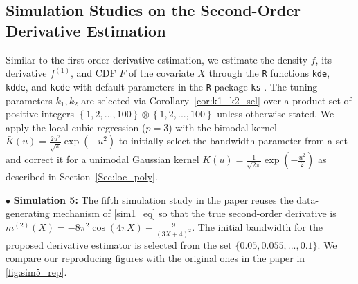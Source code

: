 \documentclass{uwstat572}
\theoremstyle{definition}
\theoremstyle{theorem}
\begin{document}
\subsection{Simulation Studies on the Second-Order Derivative Estimation}

Similar to the first-order derivative estimation, we estimate the density $f$, its derivative $f^{(1)}$, and CDF $F$ of the covariate $X$ through the \texttt{R} functions \texttt{kde}, \texttt{kdde}, and \texttt{kcde} with default parameters in the \texttt{R} package \texttt{ks} \citep{ks2022R}. The tuning parameters $k_1,k_2$ are selected via Corollary~\ref{cor:k1_k2_sel} over a product set of positive integers $\left\{1,2,...,100\right\}\otimes \left\{1,2,...,100\right\}$ unless otherwise stated. We apply the local cubic regression ($p=3$) with the bimodal kernel $\bar{K}(u)=\frac{2u^2}{\sqrt{\pi}} \exp\left(-u^2\right)$ to initially select the bandwidth parameter from a set and correct it for a unimodal Gaussian kernel $K(u)=\frac{1}{\sqrt{2\pi}} \exp\left(-\frac{u^2}{2}\right)$ as described in Section~\ref{Sec:loc_poly}.

$\bullet$ {\bf Simulation 5:} The fifth simulation study in the paper \citep{liu2020smoothed} reuses the data-generating mechanism of \eqref{sim1_eq} so that the true second-order derivative is $m^{(2)}(X) = -8\pi^2 \cos\left(4\pi X\right) - \frac{9}{(3X+4)^2}$. The initial bandwidth for the proposed derivative estimator is selected from the set $\{0.05, 0.055,...,0.1\}$. We compare our reproducing figures with the original ones in the paper in \autoref{fig:sim5_rep}.
\end{document}
